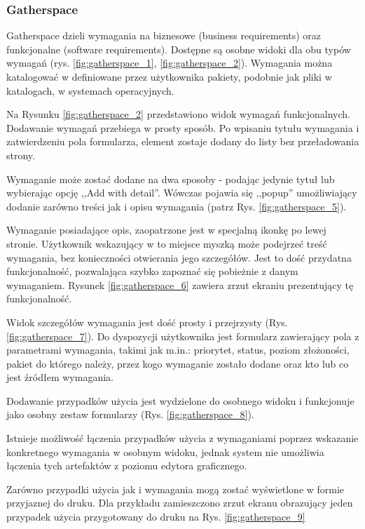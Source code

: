       \subsubsection{Gatherspace}
        Gatherspace dzieli wymagania na biznesowe (business requirements) oraz funkcjonalne (software requirements). Dostępne są osobne widoki dla obu typów wymagań (rys. \ref{fig:gatherspace_1}, \ref{fig:gatherspace_2}). Wymagania można katalogować w definiowane przez użytkownika pakiety, podobnie jak pliki w katalogach, w systemach operacyjnych. 


        Na Rysunku \ref{fig:gatherspace_2} przedstawiono widok wymagań funkcjonalnych. Dodawanie wymagań przebiega w prosty sposób. Po wpisaniu tytułu wymagania i zatwierdzeniu pola formularza, element zostaje dodany do listy bez przeładowania strony.

        Wymaganie może zostać dodane na dwa sposoby - podając jedynie tytuł lub wybierając opcję ,,Add with detail''. Wówczas pojawia się ,,popup'' umożliwiający dodanie zarówno treści jak i opisu wymagania (patrz Rys. \ref{fig:gatherspace_5}).

        Wymaganie posiadające opis, zaopatrzone jest w specjalną ikonkę po lewej stronie. Użytkownik wskazujący w to miejsce myszką może podejrzeć treść wymagania, bez konieczności otwierania jego szczegółów. Jest to dość przydatna funkcjonalność, pozwalająca szybko zapoznać się pobieżnie z danym wymaganiem. Rysunek \ref{fig:gatherspace_6} zawiera zrzut ekraniu prezentujący tę funkcjonalność. 
        
        Widok szczegółów wymagania jest dość prosty i przejrzysty (Rys. \ref{fig:gatherspace_7}). Do dyspozycji użytkownika jest formularz zawierający pola z parametrami wymagania, takimi jak m.in.: priorytet, status, poziom złożoności, pakiet do którego należy, przez kogo wymaganie zostało dodane oraz kto lub co jest źródłem wymagania.

        Dodawanie przypadków użycia jest wydzielone do osobnego widoku i funkcjonuje jako osobny zestaw formularzy (Rys. \ref{fig:gatherspace_8}). 

        Istnieje możliwość łączenia przypadków użycia z wymaganiami poprzez wskazanie konkretnego wymagania w osobnym widoku, jednak system nie umożliwia łączenia tych artefaktów z poziomu edytora graficznego.

        Zarówno przypadki użycia jak i wymagania mogą zostać wyświetlone w formie przyjaznej do druku. Dla przykładu zamieszczono zrzut ekranu obrazujący jeden przypadek użycia przygotowany do druku na Rys. \ref{fig:gatherspace_9}

